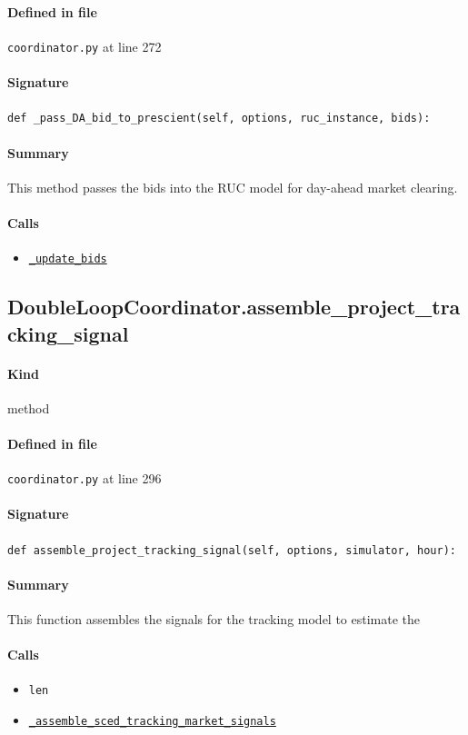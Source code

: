 \documentclass[11pt]{report}
\begin{document}
\paragraph{Defined in file} \texttt{coordinator.py} at line 272
\paragraph{Signature} \texttt{def \_pass\_DA\_bid\_to\_prescient(self, options, ruc\_instance, bids):}
\paragraph{Summary} This method passes the bids into the RUC model for day-ahead market clearing.
\paragraph{Calls}
\begin{itemize}[leftmargin=*]
  \item \hyperref[def:coordinator.py:DoubleLoopCoordinator._update_bids:L187]{\texttt{\_update\_bids}}
\end{itemize}
\subsection{DoubleLoopCoordinator.assemble\_project\_tracking\_signal}
\label{def:coordinator.py:DoubleLoopCoordinator.assemble_project_tracking_signal:L296}
\paragraph{Kind} method
\paragraph{Defined in file} \texttt{coordinator.py} at line 296
\paragraph{Signature} \texttt{def assemble\_project\_tracking\_signal(self, options, simulator, hour):}
\paragraph{Summary} This function assembles the signals for the tracking model to estimate the
\paragraph{Calls}
\begin{itemize}[leftmargin=*]
  \item \texttt{len}
  \item \hyperref[def:coordinator.py:DoubleLoopCoordinator._assemble_sced_tracking_market_signals:L683]{\texttt{\_assemble\_sced\_tracking\_market\_signals}}
\end{itemize}
\end{document}
